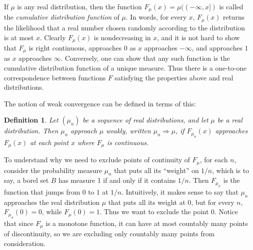 \documentclass{article}
\newtheorem{definition}[theorem]{Definition}
\begin{document}
If $\mu$ is any real distribution, then the function $F_\mu(x) = \mu((-\infty, x])$ is called the \emph{cumulative distribution function} of $\mu$. In words, for every $x$, $F_\mu(x)$ returns the likelihood that a real number chosen randomly according to the distribution is at most $x$. Clearly $F_\mu(x)$ is nondecreasing in $x$, and it is not hard to show that $F_\mu$ is right continuous, approaches $0$ as $x$ approaches $-\infty$, and approaches $1$ as $x$ approaches $\infty$. Conversely, one can show that any such function is the cumulative distribution function of a unique measure. Thus there is a one-to-one correspondence between functions $F$ satisfying the properties above and real distributions.

The notion of weak convergence can be defined in terms of this:
\begin{definition}
 Let $(\mu_n)$ be a sequence of real distributions, and let $\mu$ be a real distribution. Then \emph{$\mu_n$ approach $\mu$ weakly}, written $\mu_n \Rightarrow \mu$, if $F_{\mu_n}(x)$ approaches $F_\mu(x)$ at each point $x$ where $F_\mu$ is continuous.
\end{definition}

To understand why we need to exclude points of continuity of $F_\mu$, for each $n$, consider the probability measure $\mu_n$ that puts all its ``weight'' on $1 / n$, which is to say, a borel set $B$ has measure 1 if and only if it contains $1 / n$. Then $F_{\mu_n}$ is the function that jumps from $0$ to $1$ at $1 / n$. Intuitively, it makes sense to say that $\mu_n$ approaches the real distribution $\mu$ that puts all its weight at $0$, but for every $n$, $F_{\mu_n}(0) = 0$, while $F_\mu(0) = 1$. Thus we want to exclude the point $0$. Notice that since $F_\mu$ is a monotone function, it can have at most countably many points of discontinuity, so we are excluding only countably many points from consideration.
\end{document}
